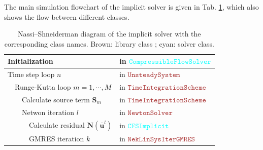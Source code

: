   The main simulation flowchart of the implicit solver is given in Tab. \ref{tab:Cfs-NSFlow-chart}, which also shows the flow between different classes.
  \begin {table}[htbp!]
    \caption {Nassi--Shneiderman diagram of the implicit solver with the corresponding
    class names. Brown: library class ; cyan: solver class.} \label{tab:Cfs-NSFlow-chart} 
  \begin{tabular}{|l|l|l|l|l|l||ll||l||l||l||l||l|}
    \hline 
    \multicolumn{7}{|l}{Initialization} & \multicolumn{6}{l|}{{\footnotesize{}in }\textcolor{cyan}{\footnotesize{}$\texttt{CompressibleFlowSolver}$}}\tabularnewline
    \hline 
    \multicolumn{7}{|l}{Time step loop $n$} & \multicolumn{6}{l|}{{\footnotesize{}in }\textcolor{brown}{\footnotesize{}$\texttt{UnsteadySystem}$}}\tabularnewline
    \cline{2-13} \cline{3-13} \cline{4-13} \cline{5-13} \cline{6-13} \cline{7-13} \cline{8-13} \cline{9-13} \cline{10-13} \cline{11-13} \cline{12-13} \cline{13-13} 
    \multirow{12}{*}{} & \multicolumn{6}{l}{Runge-Kutta loop $m=1,\cdots,M$} & \multicolumn{6}{l|}{{\footnotesize{}in }\textcolor{brown}{\footnotesize{}$\texttt{TimeIntegrationScheme}$}}\tabularnewline
    \cline{3-13} \cline{4-13} \cline{5-13} \cline{6-13} \cline{7-13} \cline{8-13} \cline{9-13} \cline{10-13} \cline{11-13} \cline{12-13} \cline{13-13} 
     & \multirow{10}{*}{} & \multicolumn{5}{l}{Calculate source term $\mathbf{S}_{m}$} & \multicolumn{6}{l|}{{\footnotesize{}in }\textcolor{brown}{\footnotesize{}$\texttt{TimeIntegrationScheme}$}}\tabularnewline
    \cline{3-13} \cline{4-13} \cline{5-13} \cline{6-13} \cline{7-13} \cline{8-13} \cline{9-13} \cline{10-13} \cline{11-13} \cline{12-13} \cline{13-13} 
     &  & \multicolumn{5}{l}{Netwon iteration $l$} & \multicolumn{6}{l|}{{\footnotesize{}in }\textcolor{brown}{\footnotesize{}$\texttt{NewtonSolver}$}}\tabularnewline
    \cline{4-13} \cline{5-13} \cline{6-13} \cline{7-13} \cline{8-13} \cline{9-13} \cline{10-13} \cline{11-13} \cline{12-13} \cline{13-13} 
     &  & \multirow{8}{*}{} & \multicolumn{4}{l}{Calculate residual $\mathbf{N}\left(\bar{\mathbf{u}}^{l}\right)$} & \multicolumn{6}{l|}{{\footnotesize{}in }\textcolor{cyan}{\footnotesize{}$\texttt{CFSImplicit}$}}\tabularnewline
    \cline{4-13} \cline{5-13} \cline{6-13} \cline{7-13} \cline{8-13} \cline{9-13} \cline{10-13} \cline{11-13} \cline{12-13} \cline{13-13} 
     &  &  & \multicolumn{4}{l}{GMRES iteration $k$} & \multicolumn{6}{l|}{{\footnotesize{}in }\textcolor{brown}{\footnotesize{}$\texttt{NekLinSysIterGMRES}$}}\tabularnewline
    \cline{5-13} \cline{6-13} \cline{7-13} \cline{8-13} \cline{9-13} \cline{10-13} \cline{11-13} \cline{12-13} \cline{13-13} 

\end{tabular}
\end{table}

